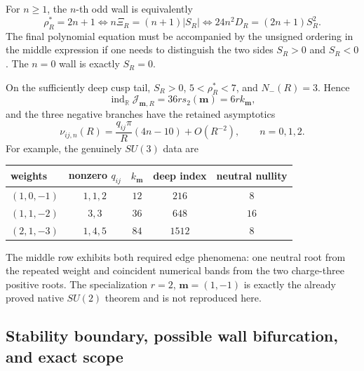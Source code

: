 For \(n\ge1\), the \(n\)-th odd wall is equivalently
\begin{equation}
 \rho_R^*=2n+1
 \iff n\Xi_R=(n+1)|S_R|
 \iff 24n^2D_R=(2n+1)S_R^2.
 \label{cusp-native-full-flux-suN-wall-equations}
\end{equation}
The final polynomial equation must be accompanied by the unsigned ordering
in the middle expression if one needs to distinguish the two sides
\(S_R>0\) and \(S_R<0\).  The \(n=0\) wall is exactly \(S_R=0\).

On the sufficiently deep cusp tail,
\(S_R>0\), \(5<\rho_R^*<7\), and \(N_-(R)=3\).  Hence
\begin{equation}
 \operatorname{ind}_{\mathbb R}\mathcal J_{\mathbf m,R}
 =36r s_2(\mathbf m)=6r k_{\mathbf m},
 \label{cusp-native-full-flux-suN-deep-index}
\end{equation}
and the three negative branches have the retained asymptotics
\begin{equation}
 \nu_{ij,n}(R)
 =\frac{q_{ij}\pi}{R}(4n-10)+O(R^{-2}),
 \qquad n=0,1,2.
 \label{cusp-native-full-flux-suN-negative-asymptotics}
\end{equation}
For example, the genuinely \(SU(3)\) data are
\begin{center}
\renewcommand{\arraystretch}{1.2}
\begin{tabular}{@{}lcccc@{}}
\toprule
weights & nonzero \(q_{ij}\) & \(k_{\mathbf m}\) & deep index
& neutral nullity\\
\midrule
\((1,0,-1)\) & \(1,1,2\) & \(12\) & \(216\) & \(8\)\\
\((1,1,-2)\) & \(3,3\) & \(36\) & \(648\) & \(16\)\\
\((2,1,-3)\) & \(1,4,5\) & \(84\) & \(1512\) & \(8\)\\
\bottomrule
\end{tabular}
\end{center}
The middle row exhibits both required edge phenomena: one neutral root from
the repeated weight and coincident numerical bands from the two charge-three
positive roots.  The specialization \(r=2\), \(\mathbf m=(1,-1)\) is
exactly the already proved native \(SU(2)\) theorem and is not reproduced
here.

\subsection{Stability boundary, possible wall bifurcation, and exact scope}

